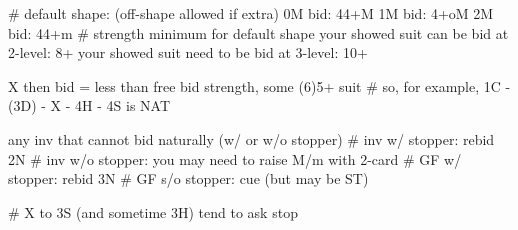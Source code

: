 # default shape: (off-shape allowed if extra)
0M bid: 44+M 
1M bid: 4+oM
2M bid: 44+m
# strength minimum for default shape
your showed suit can be bid at 2-level: 8+
your showed suit need to be bid at 3-level: 10+

X then bid = less than free bid strength, some (6)5+ suit  # so, for example, 1C - (3D) - X - 4H - 4S is NAT
    
any inv that cannot bid naturally (w/ or w/o stopper)
    # inv w/ stopper: rebid 2N
    # inv w/o stopper: you may need to raise M/m with 2-card
    # GF w/ stopper: rebid 3N
    # GF s/o stopper: cue (but may be ST)

# X to 3S (and sometime 3H) tend to ask stop